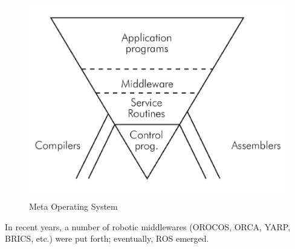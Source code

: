 \begin{figure}[H]
    \centering
    \includegraphics[scale=0.5]{Images/Chapter 2/middleware.png}
    \caption{Meta Operating System}
    \label{fig:metaoperating}
\end{figure}
 In recent years, a number of robotic middlewares (OROCOS, ORCA, YARP, BRICS, etc.) were put forth; eventually, ROS emerged. 

